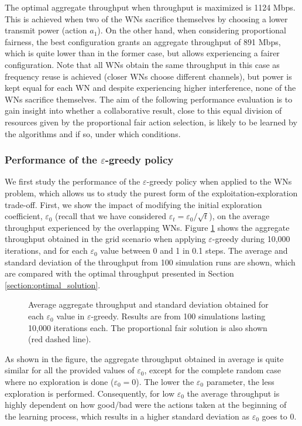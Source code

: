 \documentclass[10pt,journal,compsoc]{IEEEtran}
\begin{document}
	The optimal aggregate throughput when throughput is maximized is 1124 Mbps. This is achieved when two of the WNs sacrifice themselves by choosing a lower transmit power (action $a_1$). %
	On the other hand, when considering proportional fairness, the best configuration grants an aggregate throughput of 891 Mbps, which is quite lower than in the former case, but allows experiencing a fairer  configuration. Note that all WNs obtain the same throughput in this case as frequency reuse is achieved (closer WNs choose different channels), but power is kept equal for each WN and despite experiencing higher interference, none of the WNs sacrifice themselves. The aim of the following performance evaluation is to gain insight into whether a collaborative result, close to this equal division of resources given by the proportional fair action selection, is likely to be learned by the algorithms and if so, under which conditions.
	
	\subsubsection{Performance of the $\varepsilon$-greedy policy}
	\label{section:egreedy_study}	
	We first study the performance of the $\varepsilon$-greedy policy when applied to the WNs problem, which allows us to study the purest form of the exploitation-exploration trade-off. First, we show the impact of modifying the initial exploration coefficient, $\varepsilon_0$ (recall that we have considered $\varepsilon_t = \varepsilon_0 / \sqrt{t}$), on the average throughput experienced by the overlapping WNs. Figure \ref{fig:egreedy_tuning_parameters} shows the aggregate throughput obtained in the grid scenario when applying $\varepsilon$-greedy during 10,000 iterations, and for each $\varepsilon_0$ value between 0 and 1 in 0.1 steps. The average and standard deviation of the throughput from 100 simulation runs are shown, which are compared with the optimal throughput presented in Section \ref{section:optimal_solution}.
	\begin{figure}[t!]
		\centering							
		\caption{Average aggregate throughput and standard deviation obtained for each $\varepsilon_0$ value in $\varepsilon$-greedy. Results are from 100 simulations lasting 10,000 iterations each. The proportional fair solution is also shown (red dashed line).}
		\label{fig:egreedy_tuning_parameters}
	\end{figure}		
	As shown in the figure, the aggregate throughput obtained in average is quite similar for all the provided values of $\varepsilon_0$, except for the complete random case where no exploration is done ($\varepsilon_0 = 0$). The lower the $\varepsilon_0$ parameter, the less exploration is performed. Consequently, for low $\varepsilon_0$ the average throughput is highly dependent on how good/bad were the actions taken at the beginning of the learning process, which results in a higher standard deviation as $\varepsilon_0$ goes to 0.
	
\end{document}
